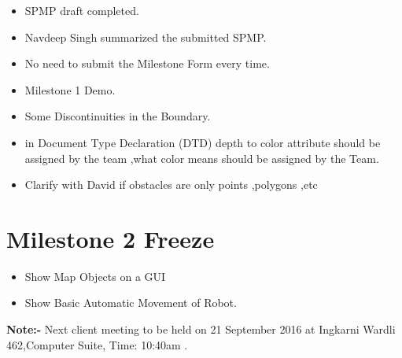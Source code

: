 \documentclass[11pt, a4paper]{article}
\begin{document}
\begin{itemize}
\item SPMP draft completed. 
\item Navdeep Singh summarized  the submitted  SPMP.
\item No  need to submit the Milestone Form every time.
\item Milestone 1 Demo.
\item Some Discontinuities in the Boundary.
\item in   Document Type Declaration (DTD)  depth to color attribute  should be assigned by the team ,what color means should be assigned by the Team.
\item Clarify with David if obstacles are only points ,polygons ,etc

\end{itemize}




\section{Milestone 2 Freeze}
\begin{itemize}
\item Show Map Objects on a GUI
\item Show Basic  Automatic Movement of Robot.

\end{itemize}







\vspace*{20pt}
\noindent  \textbf{Note:-} Next client meeting to be held on 21 September 2016 at Ingkarni Wardli 462,Computer Suite, Time: 10:40am .
\end{document}
